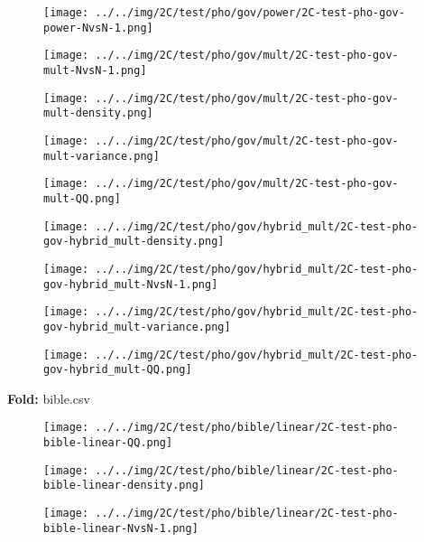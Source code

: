 \begin{figure}[H]
\centering	\texttt{[image: ../../img/2C/test/pho/gov/power/2C-test-pho-gov-power-NvsN-1.png]}
\end{figure}
\begin{figure}[H]
\centering	\texttt{[image: ../../img/2C/test/pho/gov/mult/2C-test-pho-gov-mult-NvsN-1.png]}
\end{figure}
\begin{figure}[H]
\centering	\texttt{[image: ../../img/2C/test/pho/gov/mult/2C-test-pho-gov-mult-density.png]}
\end{figure}
\begin{figure}[H]
\centering	\texttt{[image: ../../img/2C/test/pho/gov/mult/2C-test-pho-gov-mult-variance.png]}
\end{figure}
\begin{figure}[H]
\centering	\texttt{[image: ../../img/2C/test/pho/gov/mult/2C-test-pho-gov-mult-QQ.png]}
\end{figure}
\begin{figure}[H]
\centering	\texttt{[image: ../../img/2C/test/pho/gov/hybrid\_mult/2C-test-pho-gov-hybrid\_mult-density.png]}
\end{figure}
\begin{figure}[H]
\centering	\texttt{[image: ../../img/2C/test/pho/gov/hybrid\_mult/2C-test-pho-gov-hybrid\_mult-NvsN-1.png]}
\end{figure}
\begin{figure}[H]
\centering	\texttt{[image: ../../img/2C/test/pho/gov/hybrid\_mult/2C-test-pho-gov-hybrid\_mult-variance.png]}
\end{figure}
\begin{figure}[H]
\centering	\texttt{[image: ../../img/2C/test/pho/gov/hybrid\_mult/2C-test-pho-gov-hybrid\_mult-QQ.png]}
\end{figure}
\textbf{Fold:} bible.csv
\begin{figure}[H]
\centering	\texttt{[image: ../../img/2C/test/pho/bible/linear/2C-test-pho-bible-linear-QQ.png]}
\end{figure}
\begin{figure}[H]
\centering	\texttt{[image: ../../img/2C/test/pho/bible/linear/2C-test-pho-bible-linear-density.png]}
\end{figure}
\begin{figure}[H]
\centering	\texttt{[image: ../../img/2C/test/pho/bible/linear/2C-test-pho-bible-linear-NvsN-1.png]}
\end{figure}
